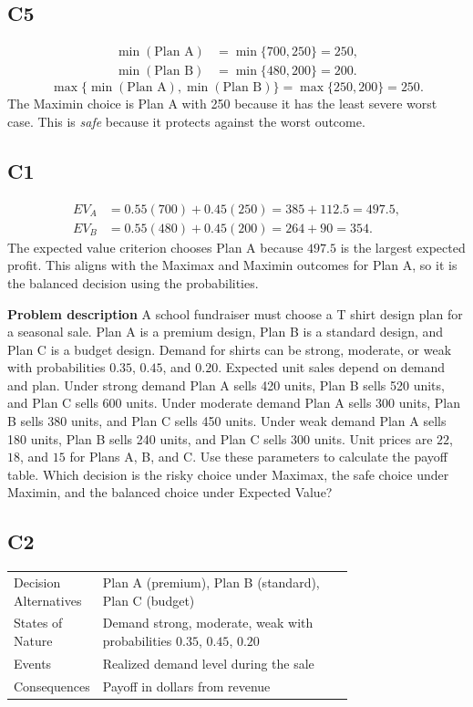 \begin{ExamProblems}
		\subsection*{C5}
		\[
		\begin{aligned}
		\min(\text{Plan A}) &= \min\{700,250\} = 250,\\
		\min(\text{Plan B}) &= \min\{480,200\} = 200.
		\end{aligned}
		\]
		\[
		\max\{\min(\text{Plan A}), \min(\text{Plan B})\}
		= \max\{250, 200\}
		= 250.
		\]
		The Maximin choice is Plan A with 250 because it has the least severe worst case. This is \emph{safe} because it protects against the worst outcome.

		\subsection*{C1}
		\[
		\begin{aligned}
		EV_A &= 0.55(700)+0.45(250)=385+112.5=497.5,\\
		EV_B &= 0.55(480)+0.45(200)=264+90=354.
		\end{aligned}
		\]
		The expected value criterion chooses Plan A because $497.5$ is the largest expected profit. This aligns with the Maximax and Maximin outcomes for Plan A, so it is the balanced decision using the probabilities.

		\item
		\textbf{Problem description}
		A school fundraiser must choose a T shirt design plan for a seasonal sale. Plan A is a premium design, Plan B is a standard design, and Plan C is a budget design. Demand for shirts can be strong, moderate, or weak with probabilities $0.35$, $0.45$, and $0.20$. Expected unit sales depend on demand and plan. Under strong demand Plan A sells 420 units, Plan B sells 520 units, and Plan C sells 600 units. Under moderate demand Plan A sells 300 units, Plan B sells 380 units, and Plan C sells 450 units. Under weak demand Plan A sells 180 units, Plan B sells 240 units, and Plan C sells 300 units. Unit prices are $22$, $18$, and $15$ for Plans A, B, and C. Use these parameters to calculate the payoff table. Which decision is the risky choice under Maximax, the safe choice under Maximin, and the balanced choice under Expected Value?

		\subsection*{C2}
		\begin{center}
			\begin{tabular}{l p{0.74\linewidth}}
				\toprule
				Decision Alternatives & Plan A (premium), Plan B (standard), Plan C (budget) \\
				States of Nature & Demand strong, moderate, weak with probabilities $0.35$, $0.45$, $0.20$ \\
				Events & Realized demand level during the sale \\
				Consequences & Payoff in dollars from revenue \\
				\bottomrule
			\end{tabular}
		\end{center}


\end{ExamProblems}
